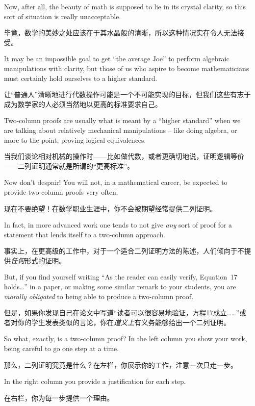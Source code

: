 Now, after all, the beauty of math is supposed to lie in its crystal clarity,
so this sort of situation is really unacceptable.

毕竟，数学的美妙之处应该在于其水晶般的清晰，所以这种情况实在令人无法接受。

It may be an impossible
goal to get ``the average Joe'' to perform algebraic manipulations with
clarity, but those of us who aspire to become mathematicians must certainly
hold ourselves to a higher standard.

让“普通人”清晰地进行代数操作可能是一个不可能实现的目标，但我们这些有志于成为数学家的人必须当然地以更高的标准要求自己。

Two-column proofs are usually what 
is meant by a ``higher standard'' when we are talking about relatively
mechanical manipulations -- like doing algebra, or more to the point,
proving logical equivalences.

当我们谈论相对机械的操作时——比如做代数，或者更确切地说，证明逻辑等价——二列证明通常就是所谓的“更高标准”。

Now don't despair!  You will not, in 
a mathematical career, be expected to provide two-column proofs very
often.

现在不要绝望！在数学职业生涯中，你不会被期望经常提供二列证明。

In fact, in more advanced work one tends to not give \emph{any} sort
of proof for a statement that lends itself to a two-column approach.

事实上，在更高级的工作中，对于一个适合二列证明方法的陈述，人们倾向于不提供\emph{任何}形式的证明。

But,
if you find yourself writing ``As the reader can easily verify, Equation~17 holds\ldots'' in a paper, or making some similar remark to your students,
you are \emph{morally obligated} to being able to produce a two-column proof.

但是，如果你发现自己在论文中写道“读者可以很容易地验证，方程17成立……”或者对你的学生发表类似的言论，你在\emph{道义上}有义务能够给出一个二列证明。

So what, exactly, is a two-column proof?  In the left column you show your 
work, being careful to go one step at a time.

那么，二列证明究竟是什么？在左栏，你展示你的工作，注意一次只走一步。

In the right column you
provide a justification for each step.

在右栏，你为每一步提供一个理由。


